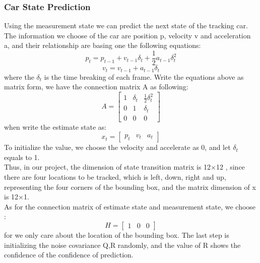\documentclass[10pt,twocolumn,letterpaper]{article}
\begin{document}
\subsubsection{Car State Prediction}
Using the measurement state we can predict the next state of the tracking car. The information we choose of the car are position p, velocity v and acceleration a, and their relationship are basing one the following equations:
\begin{equation*}    
    p_t=p_{t-1}+v_{t-1}{\delta}_t+\frac{1}{2}a_{t-1}{\delta}_t^2
\end{equation*}
\begin{equation*}    
    v_t = v_{t-1}+a_{t-1}{\delta}_t
\end{equation*}
where the ${\delta}_t$ is the time breaking of each frame.  Write the equations above as matrix form, we have the connection matrix A as following:
\begin{equation*}    
    A = \left[
 \begin{matrix}
   1 & {\delta}_t & \frac{1}{2}{\delta}_t^2 \\
   0 & 1 & {\delta}_t \\
   0 & 0 & 0
  \end{matrix}
  \right] 
\end{equation*}
when write the estimate state as:
\begin{equation*} 
x_t = \left[
    \begin{array}{ccc}
      p_t & v_t & a_t
    \end{array}
\right] 
\end{equation*}
To initialize the value, we choose the velocity and accelerate as 0, and let ${\delta_t}$ equals to 1.
\\Thus, in our project, the dimension of state transition matrix is 12$\times$12 , since there are four locations to be tracked, which is left, down, right and up, representing the four corners of the bounding box, and the matrix dimension of x is 12$\times$1. \\
As for the connection matrix of estimate state and measurement state, we choose :
\begin{equation*} 
H = \left[
    \begin{array}{ccc}
      1 & 0 & 0
    \end{array}
\right] 
\end{equation*}
for we only care about the location of the bounding box. The last step is initializing the noise covariance Q,R randomly, and the value of R shows the confidence of the confidence of prediction.
\end{document}

